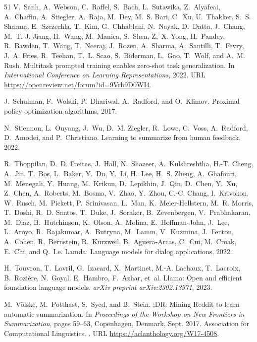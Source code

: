 \begin{thebibliography}{51}
V.~Sanh, A.~Webson, C.~Raffel, S.~Bach, L.~Sutawika, Z.~Alyafeai, A.~Chaffin,
  A.~Stiegler, A.~Raja, M.~Dey, M.~S. Bari, C.~Xu, U.~Thakker, S.~S. Sharma,
  E.~Szczechla, T.~Kim, G.~Chhablani, N.~Nayak, D.~Datta, J.~Chang, M.~T.-J.
  Jiang, H.~Wang, M.~Manica, S.~Shen, Z.~X. Yong, H.~Pandey, R.~Bawden,
  T.~Wang, T.~Neeraj, J.~Rozen, A.~Sharma, A.~Santilli, T.~Fevry, J.~A. Fries,
  R.~Teehan, T.~L. Scao, S.~Biderman, L.~Gao, T.~Wolf, and A.~M. Rush.
\newblock Multitask prompted training enables zero-shot task generalization.
\newblock In \emph{International Conference on Learning Representations}, 2022.
\newblock URL \url{https://openreview.net/forum?id=9Vrb9D0WI4}.

J.~Schulman, F.~Wolski, P.~Dhariwal, A.~Radford, and O.~Klimov.
\newblock Proximal policy optimization algorithms, 2017.

N.~Stiennon, L.~Ouyang, J.~Wu, D.~M. Ziegler, R.~Lowe, C.~Voss, A.~Radford,
  D.~Amodei, and P.~Christiano.
\newblock Learning to summarize from human feedback, 2022.

R.~Thoppilan, D.~D. Freitas, J.~Hall, N.~Shazeer, A.~Kulshreshtha, H.-T. Cheng,
  A.~Jin, T.~Bos, L.~Baker, Y.~Du, Y.~Li, H.~Lee, H.~S. Zheng, A.~Ghafouri,
  M.~Menegali, Y.~Huang, M.~Krikun, D.~Lepikhin, J.~Qin, D.~Chen, Y.~Xu,
  Z.~Chen, A.~Roberts, M.~Bosma, V.~Zhao, Y.~Zhou, C.-C. Chang, I.~Krivokon,
  W.~Rusch, M.~Pickett, P.~Srinivasan, L.~Man, K.~Meier-Hellstern, M.~R.
  Morris, T.~Doshi, R.~D. Santos, T.~Duke, J.~Soraker, B.~Zevenbergen,
  V.~Prabhakaran, M.~Diaz, B.~Hutchinson, K.~Olson, A.~Molina, E.~Hoffman-John,
  J.~Lee, L.~Aroyo, R.~Rajakumar, A.~Butryna, M.~Lamm, V.~Kuzmina, J.~Fenton,
  A.~Cohen, R.~Bernstein, R.~Kurzweil, B.~Aguera-Arcas, C.~Cui, M.~Croak,
  E.~Chi, and Q.~Le.
\newblock Lamda: Language models for dialog applications, 2022.

H.~Touvron, T.~Lavril, G.~Izacard, X.~Martinet, M.-A. Lachaux, T.~Lacroix,
  B.~Rozi{\`e}re, N.~Goyal, E.~Hambro, F.~Azhar, et~al.
\newblock Llama: Open and efficient foundation language models.
\newblock \emph{arXiv preprint arXiv:2302.13971}, 2023.

M.~V{\"o}lske, M.~Potthast, S.~Syed, and B.~Stein.
;{DR}: Mining {R}eddit to learn automatic summarization.
\newblock In \emph{Proceedings of the Workshop on New Frontiers in
  Summarization}, pages 59--63, Copenhagen, Denmark, Sept. 2017. Association
  for Computational Linguistics.
\newblock {}.
\newblock URL \url{https://aclanthology.org/W17-4508}.


\end{thebibliography}
